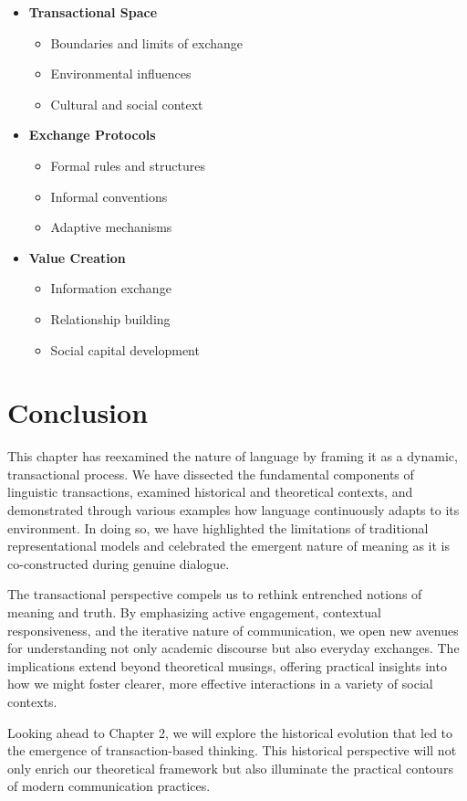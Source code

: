 \documentclass[12pt]{article}
\begin{document}
\begin{tcolorbox}[featurebox, title=Core Elements of Transactional Framework]
\begin{itemize}
\item \textbf{Transactional Space}
  \begin{itemize}
  \item Boundaries and limits of exchange
  \item Environmental influences
  \item Cultural and social context
  \end{itemize}
\item \textbf{Exchange Protocols}
  \begin{itemize}
  \item Formal rules and structures
  \item Informal conventions
  \item Adaptive mechanisms
  \end{itemize}
\item \textbf{Value Creation}
  \begin{itemize}
  \item Information exchange
  \item Relationship building
  \item Social capital development
  \end{itemize}
\end{itemize}
\end{tcolorbox}

\section{Conclusion}

This chapter has reexamined the nature of language by framing it as a dynamic, transactional process. We have dissected the fundamental components of linguistic transactions, examined historical and theoretical contexts, and demonstrated through various examples how language continuously adapts to its environment. In doing so, we have highlighted the limitations of traditional representational models and celebrated the emergent nature of meaning as it is co-constructed during genuine dialogue.

The transactional perspective compels us to rethink entrenched notions of meaning and truth. By emphasizing active engagement, contextual responsiveness, and the iterative nature of communication, we open new avenues for understanding not only academic discourse but also everyday exchanges. The implications extend beyond theoretical musings, offering practical insights into how we might foster clearer, more effective interactions in a variety of social contexts.

Looking ahead to Chapter 2, we will explore the historical evolution that led to the emergence of transaction-based thinking. This historical perspective will not only enrich our theoretical framework but also illuminate the practical contours of modern communication practices.

\printbibliography[title=References]
\end{document}
